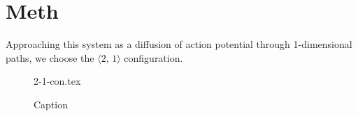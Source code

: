 \documentclass[class={myRUCProject}, crop=false]{standalone}
\begin{document}





\section{Meth}

Approaching this system as a diffusion of action potential through 1-dimensional paths, we choose the \(\langle 2,\,1 \rangle\) configuration.
\begin{figure}[H]
    \centering
    {2-1-con.tex}
    \caption{Caption}\label{fig:2-1-con}
\end{figure}
\end{document}
